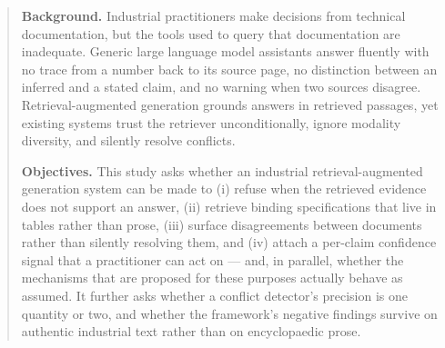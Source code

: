 \documentclass[preprint,3p,times]{elsarticle}
\begin{document}
\begin{abstract}
\textbf{Background.} Industrial practitioners make decisions from technical
documentation, but the tools used to query that documentation are inadequate.
Generic large language model assistants answer fluently with no trace from a
number back to its source page, no distinction between an inferred and a stated
claim, and no warning when two sources disagree. Retrieval-augmented generation
grounds answers in retrieved passages, yet existing systems trust the retriever
unconditionally, ignore modality diversity, and silently resolve conflicts.

\textbf{Objectives.} This study asks whether an industrial retrieval-augmented
generation system can be made to (i) refuse when the retrieved evidence does not
support an answer, (ii) retrieve binding specifications that live in tables
rather than prose, (iii) surface disagreements between documents rather than
silently resolving them, and (iv) attach a per-claim confidence signal that a
practitioner can act on --- and, in parallel, whether the mechanisms that are
proposed for these purposes actually behave as assumed. It further asks
whether a conflict detector's precision is one quantity or two, and whether
the framework's negative findings survive on authentic industrial text rather
than on encyclopaedic prose.


\end{abstract}
\end{document}
